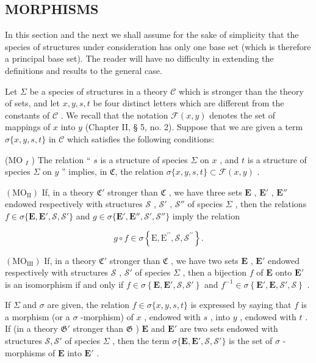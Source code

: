 \subsection{MORPHISMS}

In this section and the next we shall assume for the sake of simplicity that the species of structures under consideration has only one base set (which is therefore a principal base set). The reader will have no difficulty in extending the definitions and results to the general case.

Let \(\Sigma\) be a species of structures in a theory \(\mathcal{C}\) which is stronger than the theory of sets, and let \(x, y, s, t\) be four distinct letters which are different from the constants of \(\mathcal{C}\) . We recall that the notation \(\mathcal{F}(x, y)\) denotes the set of mappings of \(x\) into \(y\) (Chapter II, § 5, no. 2). Suppose that we are given a term \(\sigma\{x, y, s, t\}\) in \(\mathcal{C}\) which satisfies the following conditions:

(MO \(_{I}\) ) The relation `` \(s\) is a structure of species \(\Sigma\) on \(x\) , and \(t\) is a structure of species \(\Sigma\) on \(y\) '' implies, in \(\mathfrak{C}\), the relation \(\sigma\{x,y,s,t\} \subset \mathcal{F}(x,y)\) .

\((\mathrm{MO}_{\mathrm{II}})\) If, in a theory \(\mathfrak{C}'\) stronger than \(\mathfrak{C}\) , we have three sets \(\mathbf{E}\) , \(\mathbf{E}'\) , \(\mathbf{E}''\) endowed respectively with structures \(\mathscr{S}\) , \(\mathscr{S}'\) , \(\mathscr{S}''\) of species \(\Sigma\) , then the relations \(f \in \sigma \{ \mathbf{E}, \mathbf{E}', \mathscr{S}, \mathscr{S}' \}\) and \(g \in \sigma \{ \mathbf{E}', \mathbf{E}'', \mathscr{S}', \mathscr{S}'' \}\) imply the relation

\[
g \circ f \in \sigma \left\{\mathrm{E}, \mathrm{E} ^ {\prime \prime}, \mathscr {S}, \mathscr {S} ^ {\prime \prime} \right\}.
\]

\((\mathrm{MO}_{\mathrm{III}})\) If, in a theory \(\mathfrak{C}'\) stronger than \(\mathfrak{C}\) , we have two sets \(\mathbf{E}\) , \(\mathbf{E}'\) endowed respectively with structures \(\mathcal{S}\) , \(\mathcal{S}'\) of species \(\Sigma\) , then a bijection \(f\) of \(\mathbf{E}\) onto \(\mathbf{E}'\) is an isomorphism if and only if \(f \in \sigma \left\{\mathbf{E}, \mathbf{E}', \mathcal{S}, \mathcal{S}'\right\}\) and \(f^{-1} \in \sigma \left\{\mathbf{E}', \mathbf{E}, \mathcal{S}', \mathcal{S}\right\}\) .

If \(\Sigma\) and \(\sigma\) are given, the relation \(f \in \sigma\{x, y, s, t\}\) is expressed by saying that \(f\) is a morphism (or a \(\sigma\) -morphism) of \(x\) , endowed with \(s\) , into \(y\) , endowed with \(t\) . If (in a theory \(\mathfrak{G}'\) stronger than \(\mathfrak{G}\) ) \(\mathbf{E}\) and \(\mathbf{E}'\) are two sets endowed with structures \(\mathcal{S}, \mathcal{S}'\) of species \(\Sigma\) , then the term \(\sigma\{\mathbf{E}, \mathbf{E}', \mathcal{S}, \mathcal{S}'\}\) is the set of \(\sigma\) -morphisms of \(\mathbf{E}\) into \(\mathbf{E}'\) .

